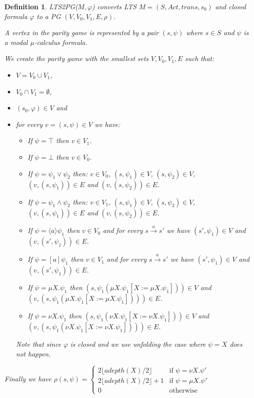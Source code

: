 \documentclass[]{article}
\newtheorem{definition}{Definition}[section]
\begin{document}
\begin{definition}
	\label{def_LTS2PG}\cite{Bradfield2018}
	LTS2PG($M, \varphi$) converts LTS $M = (S, Act, trans, s_0)$ and closed formula $\varphi$ to a PG $(V, V_0, V_1, E, \rho)$.
	
	A vertex in the parity game is represented by a pair $(s, \psi)$ where $s \in S$ and $\psi$ is a modal $\mu$-calculus formula.
	
	We create the parity game with the smallest sets $V, V_0, V_1, E$ such that:
	\begin{itemize}
		\item $V = V_0 \cup V_1$,
		\item $V_0 \cap V_1 = \emptyset$, 
		\item $(s_0, \varphi) \in V$ and
		\item for every $v = (s, \psi) \in V$ we have:
		\begin{itemize}
			\item If $\psi = \top$ then $v \in V_1$.
			\item If $\psi = \bot$ then $v \in V_0$.
			\item If $\psi = \psi_1 \vee \psi_2$ then:
				\subitem $v \in V_0$,
				\subitem $(s, \psi_1) \in V$,
				\subitem $(s, \psi_2) \in V$,
				\subitem $(v, (s,\psi_1)) \in E$ and
				\subitem $(v, (s,\psi_2)) \in E$.
			\item If $\psi = \psi_1 \wedge \psi_2$ then:
				\subitem $v \in V_1$,
				\subitem $(s, \psi_1) \in V$,
				\subitem $(s, \psi_2) \in V$,
				\subitem $(v, (s,\psi_1)) \in E$ and
				\subitem $(v, (s,\psi_2)) \in E$.
			\item If $\psi = \langle a \rangle \psi_1$ then $v \in V_0$ and for every $s \xrightarrow{ a} s'$ we have $(s', \psi_1) \in V$ and $(v, (s', \psi_1)) \in E$.
			\item If $\psi = [ a ] \psi_1$ then $v \in V_1$ and for every $s \xrightarrow{ a} s'$ we have $(s', \psi_1) \in V$ and $(v, (s', \psi_1)) \in E$.
			\item If $\psi = \mu X. \psi_1$ then $(s, \psi_1(\mu X. \psi_1[X:=\mu X. \psi_1])) \in V$ and $(v, (s, \psi_1(\mu X. \psi_1[X:=\mu X. \psi_1]))) \in E$.
			\item If $\psi = \nu X. \psi_1$ then $(s, \psi_1(\nu X. \psi_1[X:=\nu X. \psi_1])) \in V$ and $(v, (s, \psi_1(\nu X. \psi_1[X:=\nu X. \psi_1]))) \in E$.
		\end{itemize}
	Note that since $\varphi$ is closed and we use unfolding the case where $\psi = X$ does not happen.
	\end{itemize}


Finally we have $\rho(s, \psi) = \begin{cases}
2 \lfloor adepth(X) / 2 \rfloor & \text{if } \psi = \nu X. \psi'\\
2 \lfloor adepth(X) / 2 \rfloor + 1 & \text{if } \psi = \mu X. \psi'\\
0 & \text{otherwise}
\end{cases}$
\end{definition}
\end{document}

